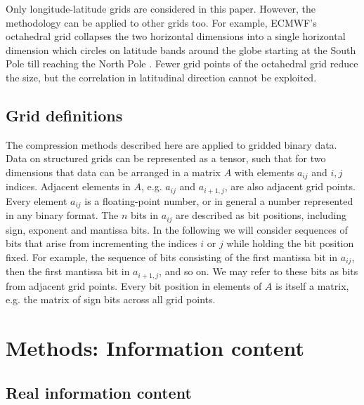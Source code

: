 Only longitude-latitude grids are considered in this paper. However, the methodology can be applied to other grids too.
For example, ECMWF’s octahedral grid collapses the two horizontal dimensions into a single horizontal dimension
which circles on latitude bands around the globe starting at the South Pole till reaching the North Pole \citep{Malardel2016}.
Fewer grid points of the octahedral grid reduce the size, but the correlation in latitudinal direction cannot be exploited.

\subsection{Grid definitions}

The compression methods described here are applied to gridded binary data. Data on structured grids can be represented as a tensor,
such that for two dimensions that data can be arranged in a matrix $A$  with elements $a_{ij}$ and $i,j$ indices.
Adjacent elements in $A$, e.g. $a_{ij}$ and $a_{i+1,j}$, are also adjacent grid points. Every element $a_{ij}$ is a floating-point number,
or in general a number represented in any binary format. The $n$ bits in $a_{ij}$ are described as bit positions, including sign, exponent
and mantissa bits. In the following we will consider sequences of bits that arise from incrementing the indices $i$ or $j$ while holding the
bit position fixed. For example, the sequence of bits consisting of the first mantissa bit in $a_{ij}$, then the first mantissa bit in $a_{i+1,j}$,
and so on. We may refer to these bits as bits from adjacent grid points. Every bit position in elements of $A$ is itself a matrix, e.g.
the matrix of sign bits across all grid points.

\section{Methods: Information content}
\label{sec:compression_methods_information_content}

\subsection{Real information content}

